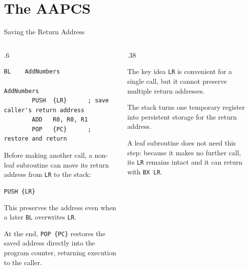 \documentclass[9pt,aspectratio=169,xcolor=table]{beamer}
\begin{document}
\section{The AAPCS}



\begin{frame}[fragile]{Saving the Return Address}
	\begin{columns}[T]
		\begin{column}{.6\textwidth}
			\begin{lstlisting}[style=armasm, language=ARM, basicstyle=\small\ttfamily]
		BL    AddNumbers

AddNumbers
		PUSH  {LR}      ; save caller's return address
		ADD   R0, R0, R1
		POP   {PC}      ; restore and return
			\end{lstlisting}

			\vspace{3mm}
			{\small
				Before making another call, a non-leaf subroutine
				can move its return address from \texttt{LR} to the
				stack:

				\begin{center}
					\texttt{PUSH \{LR\}}
				\end{center}

				This preserves the address even when a later
				\texttt{BL} overwrites \texttt{LR}.

				\vspace{1mm}
				At the end, \texttt{POP \{PC\}} restores the saved
				address directly into the program counter, returning
				execution to the caller.
			}
		\end{column}

		\begin{column}{.38\textwidth}
			\begin{block}{The key idea}
				\texttt{LR} is convenient for a single call, but it
				cannot preserve multiple return addresses.

				\vspace{2mm}
				\alert{The stack turns one temporary register into
					persistent storage for the return address.}
			\end{block}

			\vspace{2mm}
			{\small
				A leaf subroutine does not need this step: because it
				makes no further call, its \texttt{LR} remains intact
				and it can return with \texttt{BX LR}.
			}
		\end{column}
	\end{columns}
\end{frame}
\end{document}
